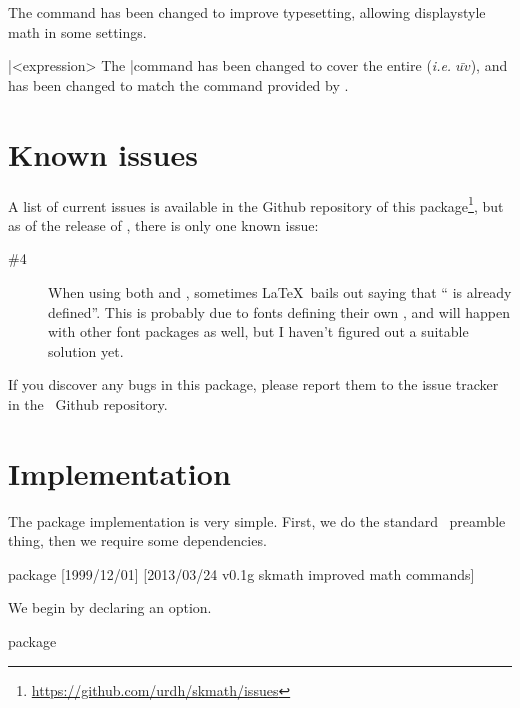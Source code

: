 \documentclass[commonsets,load]{skdoc}
\begin{document}
  \DescribeMacro{}
  The \Macro\frac command has been changed to improve typesetting,
  allowing displaystyle math in some settings.
 
  \DescribeMacro\bar{<expression>}
  \DescribeMacro{}
  The \Macro\bar command has been changed to cover the entire 
   (\emph{i.e.} \(\bar{uv}\)), and \Macro\vec has
  been changed to match the  command provided by 
  .

  \section{Known issues}
  A list of current issues is available in the Github repository of this
  package\footnote{\url{https://github.com/urdh/skmath/issues}}, but as
  of the release of \theversion, there is only one known issue:
  \begin{description}
      \item[\#4]  When using both  and \thepackage, sometimes
                  \LaTeX\ bails out saying that \enquote{ is already
                  defined}. This is probably due to fonts defining their own
                  , and will happen with other font packages as well,
                  but I haven't figured out a suitable solution yet.
  \end{description}
  If you discover any bugs in this package, please report them to the issue
  tracker in the \thepackage\ Github repository.

  \section{Implementation}
  The package implementation is very simple. First, we do the standard
  \LaTeXe\ preamble thing, then we require some dependencies.
\begin{MacroCode}{package}
[1999/12/01]
%
    [2013/03/24 v0.1g skmath improved math commands]
\RequirePackage{xparse}
\RequirePackage{kvoptions,amssymb,mathtools,xfrac,isomath}
\end{MacroCode}

  We begin by declaring an option.
\begin{MacroCode}{package}
\ProcessKeyvalOptions*
\end{MacroCode}
\end{document}
